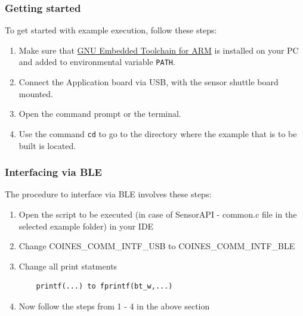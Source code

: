 \documentclass{article}
\begin{document}
\subsubsection{Getting started}
To get started with example execution, follow these steps:
\begin{enumerate}
	\item Make sure that \href{https://developer.arm.com/downloads/-/arm-gnu-toolchain-downloads}{GNU Embedded Toolchain for ARM} is installed on your PC and added to environmental variable \texttt{PATH}.
	\item Connect the Application board via USB, with the sensor shuttle board mounted.
	\item Open the command prompt or the terminal.
	\item Use the command \texttt{cd} to go to the directory where the example that is to be built is located.
\end{enumerate}

\subsubsection{Interfacing via BLE}
The procedure to interface via BLE involves these steps:
\begin{enumerate}
	\item Open the script to be executed (in case of SensorAPI - common.c file in the selected example folder) in your IDE
	\item Change COINES\_COMM\_INTF\_USB  to COINES\_COMM\_INTF\_BLE
	\item Change all print statments
	\begin{verbatim}
	printf(...) to fprintf(bt_w,...)
	\end{verbatim}
	\item Now follow the steps from 1 - 4 in the above section
\end{enumerate}
\end{document}
